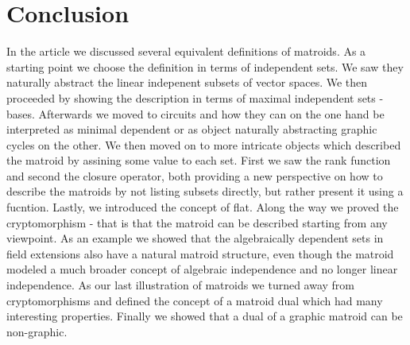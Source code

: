 \section{Conclusion}
In the article we discussed several equivalent definitions of matroids. As a starting point we choose the definition in terms of independent sets. We saw they naturally abstract the linear indepenent subsets of vector spaces. We then proceeded by showing the description in terms of maximal independent sets - bases. Afterwards we moved to circuits and how they can on the one hand be interpreted as minimal dependent or as object naturally abstracting graphic cycles on the other. We then moved on to more intricate objects which described the matroid by assining some value to each set. First we saw the rank function and second the closure operator, both providing a new perspective on how to describe the matroids by not listing subsets directly, but rather present it using a fucntion. Lastly, we introduced the concept of flat. Along the way we proved the cryptomorphism - that is that the matroid can be described starting from any viewpoint. As an example we showed that the algebraically dependent sets in field extensions also have a natural matroid structure, even though the matroid modeled a much broader concept of algebraic independence and no longer linear independence. As our last illustration of matroids we turned away from cryptomorphisms and defined the concept of a matroid dual which had many interesting properties. Finally we showed that a dual of a graphic matroid can be non-graphic.
